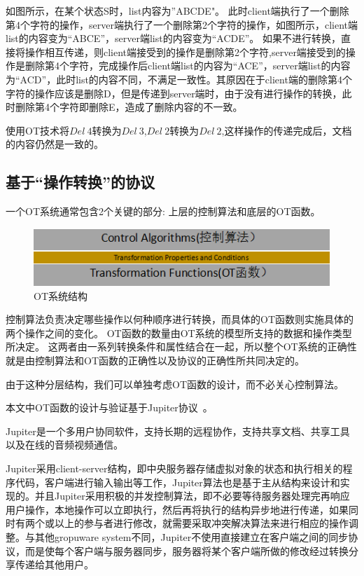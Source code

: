 如图所示，在某个状态S时，list内容为”ABCDE"。
此时client端执行了一个删除第4个字符的操作，server端执行了一个删除第2个字符的操作，如图所示，client端list的内容变为“ABCE”，server端list的内容变为“ACDE”。
如果不进行转换，直接将操作相互传递，则client端接受到的操作是删除第2个字符,server端接受到的操作是删除第4个字符，完成操作后client端list的内容为“ACE”，server端list的内容为“ACD”，此时list的内容不同，不满足一致性。其原因在于client端的删除第4个字符的操作应该是删除D，但是传递到server端时，由于没有进行操作的转换，此时删除第4个字符即删除E，造成了删除内容的不一致。

使用OT技术将$Del\ 4$转换为$Del\ 3$,$Del\ 2$转换为$Del\ 2$,这样操作的传递完成后，文档的内容仍然是一致的。

\subsection{基于``操作转换''的协议}
一个OT系统通常包含2个关键的部分: 上层的控制算法和底层的OT函数。

\begin{figure}[H]
\centering
\includegraphics{figures/structure.bmp}
\caption{OT系统结构}
\end{figure}

控制算法负责决定哪些操作以何种顺序进行转换，而具体的OT函数则实施具体的两个操作之间的变化。
OT函数的数量由OT系统的模型所支持的数据和操作类型所决定。
这两者由一系列转换条件和属性结合在一起，所以整个OT系统的正确性就是由控制算法和OT函数的正确性以及协议的正确性所共同决定的。

由于这种分层结构，我们可以单独考虑OT函数的设计，而不必关心控制算法。

本文中OT函数的设计与验证基于Jupiter协议~\cite{Nichols:UIST95}。

Jupiter是一个多用户协同软件，支持长期的远程协作，支持共享文档、共享工具以及在线的音频视频通信。

Jupiter采用client-server结构，即中央服务器存储虚拟对象的状态和执行相关的程序代码，客户端进行输入输出等工作，Jupiter算法也是基于主从结构来设计和实现的。并且Jupiter采用积极的并发控制算法，即不必要等待服务器处理完再响应用户操作，本地操作可以立即执行，然后再将执行的结构异步地进行传递，如果同时有两个或以上的参与者进行修改，就需要采取冲突解决算法来进行相应的操作调整。与其他gropuware system不同，Jupiter不使用直接建立在客户端之间的同步协议，而是使每个客户端与服务器同步，服务器将某个客户端所做的修改经过转换分享传递给其他用户。

